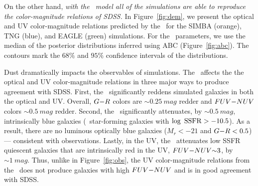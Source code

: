 On the other hand, \emph{with the \eda~model all of the simulations are able to
reproduce the color-magnitude relations of SDSS.} In Figure~\ref{fig:dem}, 
we present the optical and UV color-magnitude relations predicted by the 
\eda~for the SIMBA (orange), TNG (blue), and EAGLE (green) simulations. 
For the \eda~parameters, we use the median of the posterior distributions 
inferred using ABC (Figure~\ref{fig:abc}). The contours mark the $68\%$ and 
$95\%$ confidence intervals of the distributions.


Dust dramatically impacts the observables of simulations. The \eda~affects the 
the optical and UV color-magnitude relations in three major ways to produce 
agreement with SDSS. First, the \eda~significantly reddens simulated galaxies in both 
the optical and UV.  Overall, $G{-}R$ colors are ${\sim}0.25~mag$ redder and 
$FUV{-}NUV$ colors ${\sim}0.5~mag$ redder. Second, the \eda~significantly attenuates, by
${\sim}0.5~mag$, intrinsically blue galaxies (\ie~star-forming galaxies with
$\log~{\rm SSFR} > -10.5$). As a result, there are no luminous optically blue 
galaxies ($M_r < -21$ and $G{-}R < 0.5$) --- consistent with observations.
Lastly, in the UV, the \eda~attenuates low SSFR quiescent galaxies that are 
intrinsically red in the UV, $FUV{-}NUV{\sim}3$, by ${\sim}1~mag$. Thus, unlike in
Figure~\ref{fig:obs}, the UV color-magnitude relations from the \eda~does not
produce galaxies with high $FUV{-}NUV$ and is in good agreement with SDSS. 


